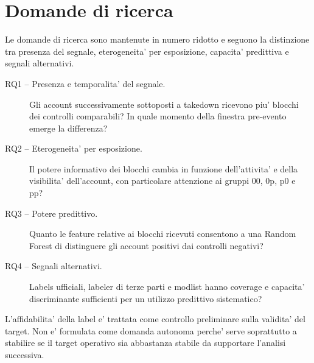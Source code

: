 \section{Domande di ricerca}

Le domande di ricerca sono mantenute in numero ridotto e seguono la distinzione tra presenza del segnale, eterogeneita' per esposizione, capacita' predittiva e segnali alternativi.

\begin{description}
  \item[RQ1 -- Presenza e temporalita' del segnale.] Gli account successivamente sottoposti a takedown ricevono piu' blocchi dei controlli comparabili? In quale momento della finestra pre-evento emerge la differenza?
  \item[RQ2 -- Eterogeneita' per esposizione.] Il potere informativo dei blocchi cambia in funzione dell'attivita' e della visibilita' dell'account, con particolare attenzione ai gruppi 00, 0p, p0 e pp?
  \item[RQ3 -- Potere predittivo.] Quanto le feature relative ai blocchi ricevuti consentono a una Random Forest di distinguere gli account positivi dai controlli negativi?
  \item[RQ4 -- Segnali alternativi.] Labels ufficiali, labeler di terze parti e modlist hanno coverage e capacita' discriminante sufficienti per un utilizzo predittivo sistematico?
\end{description}

L'affidabilita' della label  e' trattata come controllo preliminare sulla validita' del target. Non e' formulata come domanda autonoma perche' serve soprattutto a stabilire se il target operativo sia abbastanza stabile da supportare l'analisi successiva.
